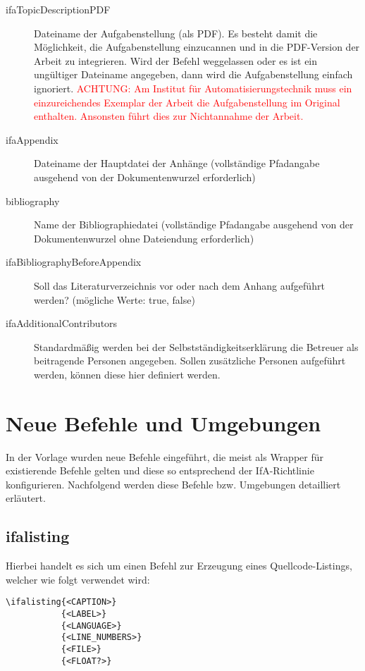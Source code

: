 \begin{description}
  \item[ifaTopicDescriptionPDF] Dateiname der Aufgabenstellung (als PDF). Es besteht damit die Möglichkeit, die Aufgabenstellung einzucannen und in die PDF-Version der Arbeit zu integrieren. Wird der Befehl weggelassen oder es ist ein ungültiger Dateiname angegeben, dann wird die Aufgabenstellung einfach ignoriert. \textcolor{red}{ACHTUNG: Am Institut für Automatisierungstechnik muss ein einzureichendes Exemplar der Arbeit die Aufgabenstellung im Original enthalten. Ansonsten führt dies zur Nichtannahme der Arbeit.}
  \item[ifaAppendix] Dateiname der Hauptdatei der Anhänge (vollständige Pfadangabe ausgehend von der Dokumentenwurzel erforderlich)
  \item[bibliography] Name der Bibliographiedatei (vollständige Pfadangabe
  ausgehend von der Dokumentenwurzel ohne Dateiendung erforderlich)
  \item[ifaBibliographyBeforeAppendix] Soll das Literaturverzeichnis vor oder nach dem Anhang aufgeführt werden? (mögliche Werte: true, false)
  \item[ifaAdditionalContributors] Standardmäßig werden bei der
  Selbstständigkeitserklärung die Betreuer als beitragende Personen angegeben.
  Sollen zusätzliche Personen aufgeführt werden, können diese hier definiert werden.
\end{description}

\section{Neue Befehle und Umgebungen}
\label{sec:BefehleUndUmgebungen}

In der Vorlage wurden neue Befehle eingeführt, die meist als Wrapper für existierende Befehle gelten und diese so entsprechend der IfA-Richtlinie konfigurieren. Nachfolgend werden diese Befehle bzw. Umgebungen detailliert erläutert.

\subsection{ifalisting}
Hierbei handelt es sich um einen Befehl zur Erzeugung eines Quellcode-Listings, welcher wie folgt verwendet wird:

\begin{verbatim}
\ifalisting{<CAPTION>}
           {<LABEL>}
           {<LANGUAGE>}
           {<LINE_NUMBERS>}
           {<FILE>}
           {<FLOAT?>}
\end{verbatim}

